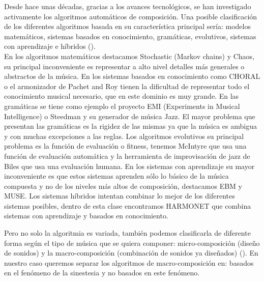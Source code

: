 Desde hace unas décadas, gracias a los avances tecnológicos, se han investigado activamente los algoritmos automáticos de composición. Una posible clasificación de los diferentes algoritmos basada en su característica principal sería: modelos matemáticos, sistemas basados en conocimiento, gramáticas, evolutivos, sistemas con aprendizaje e híbridos (\cite{AIMethodsForComposition}). \\
\color{blue} En los algoritmos matemáticos destacamos Stochastic (Markov chains) y Chaos, su principal inconveniente es representar a alto nivel detalles más generales o abstractos de la música. En los sistemas basados en conocimiento como CHORAL o el armonizador de Pachet and Roy tienen la dificultad de representar todo el conocimiento musical necesario, que en este dominio  es muy grande. En las gramáticas se tiene como ejemplo el proyecto EMI (Experiments in Musical Intelligence) o Steedman y su generador de música Jazz. El mayor problema que presentan las gramáticas es la rigidez de las mismas ya que la música es ambigua y con muchas excepciones a las reglas. Los algoritmos evolutivos su principal problema es la función de evaluación o fitness, tenemos McIntyre que usa una función de evaluación automática y la herramienta de improvisación de jazz de Biles que usa una evaluación humana. En los sistemas con aprendizaje su mayor inconveniente es que estos sistemas aprenden sólo lo básico de la música compuesta y no de los niveles más altos de composición, destacamos EBM y MUSE. Los sistemas híbridos intentan combinar lo mejor de los diferentes sistemas posibles, dentro de esta clase encontramos HARMONET que combina sistemas con aprendizaje y basados en conocimiento.
\color{black}

Pero no solo la algoritmia es variada, también podemos clasificarla de diferente forma según el tipo de música que se quiera componer: micro-composición (diseño de sonidos) y la macro-composición (combinación de sonidos ya diseñados) (\cite{AudioVisualSurvey}). \color{blue} En nuestro caso queremos separar los algoritmos de macro-composición en: basados en el fenómeno de la sinestesia y no basados en este fenómeno.\\ \color{black}

